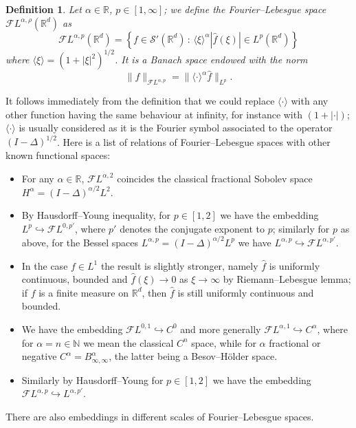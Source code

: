 \documentclass[10pt]{article}
\newtheorem{definition}[theorem]{Definition}
\begin{document}
\begin{definition}
  \label{appendixA2 defn fourier lebesgue} Let $\alpha \in \mathbb{R}$, $p \in
  [1, \infty]$; we define the Fourier--Lebesgue space $\mathcal{F} L^{\alpha,
  \rho} (\mathbb{R}^d)$ as
  \[ \mathcal{F} L^{\alpha, p} (\mathbb{R}^d) = \left\{ f \in \mathcal{S}'
     (\mathbb{R}^d) \, : \, \langle \xi \rangle^{\alpha} | \hat{f} (\xi) | \in
     L^p (\mathbb{R}^d) \right\} \]
  where $\langle \xi \rangle = (1 + | \xi |^2)^{1 / 2}$. It is a Banach space
  endowed with the norm
  \[ \| f \|_{\mathcal{F} L^{\alpha, p}} = \| \langle \cdot \rangle^{\alpha}
     \hat{f} \|_{L^p} . \]
\end{definition}

It follows immediately from the definition that we could replace $\langle
\cdot \rangle$ with any other function having the same behaviour at infinity,
for instance with $(1 + | \cdot |)$; $\langle \cdot \rangle$ is usually
considered as it is the Fourier symbol associated to the operator $(I -
\Delta)^{1 / 2}$. Here is a list of relations of Fourier--Lebesgue spaces with
other known functional spaces:
\begin{itemize}
  \item For any $\alpha \in \mathbb{R}$, $\mathcal{F} L^{\alpha, 2}$ coincides
  the classical fractional Sobolev space $H^{\alpha} = (I - \Delta)^{\alpha /
  2} L^2$.
  
  \item By Hausdorff--Young inequality, for $p \in [1, 2]$ we have the
  embedding $L^p \hookrightarrow \mathcal{F} L^{0, p'}$, where $p'$ denotes
  the conjugate exponent to $p$; similarly for $p$ as above, for the Bessel
  spaces $L^{\alpha, p} = (I - \Delta)^{\alpha / 2} L^p$ we have $L^{\alpha,
  p} \hookrightarrow \mathcal{F} L^{\alpha, p'}$.
  
  \item In the case $f \in L^1$ the result is slightly stronger, namely
  $\hat{f}$ is uniformly continuous, bounded and $\hat{f} (\xi) \rightarrow 0$
  as $\xi \rightarrow \infty$ by Riemann--Lebesgue lemma; if $f$ is a finite
  measure on $\mathbb{R}^d$, then $\hat{f}$ is still uniformly continuous and
  bounded.
  
  \item We have the embedding $\mathcal{F} L^{0, 1} \hookrightarrow C^0$ and
  more generally $\mathcal{F} L^{\alpha, 1} \hookrightarrow C^{\alpha}$, where
  for $\alpha = n \in \mathbb{N}$ we mean the classical $C^n$ space, while for
  $\alpha$ fractional or negative $C^{\alpha} = B^{\alpha}_{\infty, \infty}$,
  the latter being a Besov--H\"{o}lder space.
  
  \item Similarly by Hausdorff--Young for $p \in [1, 2]$ we have the embedding
  $\mathcal{F} L^{\alpha, p} \hookrightarrow L^{\alpha, p'}$.
\end{itemize}
There are also embeddings in different scales of Fourier--Lebesgue spaces.
\end{document}
